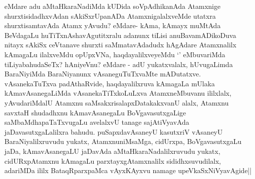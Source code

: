 \begin{artha}
eMdare adu aMtaHkaraNadiMda kUDida soVpAdhikanAda Atamxnige shurxtisidadhxvAdan sAkiSxrUpanADa AtamxnigalalxveMde utatxra shurxtisamtavAda Atamx yAvudu? eMdare- kAma, kAmayx muMtAda BeVdagaLu huTiTxnAshavAgutitxralu adanunx tiLisi anuBavamADikoDuva nitayx sAkiSx ceVtanave  shurxti saMmatavAdadudx hAgAdare Atamxnalilx kAmagaLu ilalxveMdu opUpxVNa, haqdayalilxveyeMdu `\stext' eMbuvariMda tiLiyabahudaSeTx? hAniyeVnu? eMdare - adU yukatxvalalx, hUvugaLimda BaraNiyiMda BaraNiyanunx vAsaneguTuTxvaMte mADutatxve. vAsanekaTuTxva padAthaRvide, haqdayalilxruva kAmagaLa mUlaka kAmavAsanegaLiMda vAsanekaTiTxkoLuLxva AtamxneMbuvanu ililxlalx, yAvudariMdalU Atamxnu saMsakxrisalapxDatakakxvanU alalx, Atamxnu savxtaH shudadhxnu kAmavAsanegaLu BoVgavasutxgaLige saMbaMdhapaTaTxvugaLu avelalxvU tanage sajAtiVyavAda jaDavasutxgaLalilxra bahudu. puSapxdavAsaneyU kasutxriV vAsaneyU BaraNiyalilxruvudu yukatx, AtamxnuniMsaMga, cidUrxpa, BoVgavasutxgaLu jaDa, kAmavAsanegaLU jaDavAda aMtaHkaraNadalilxruvudu yukatx, cidURxpAtamxnu kAmagaLu parxtayxgAtamxnalilx sididhxsuvudilalx, adariMDa ililx BataqRparxpaMca vAyxKAyxvu namage upeVkaSxNiVyavAgide||
\end{artha}

